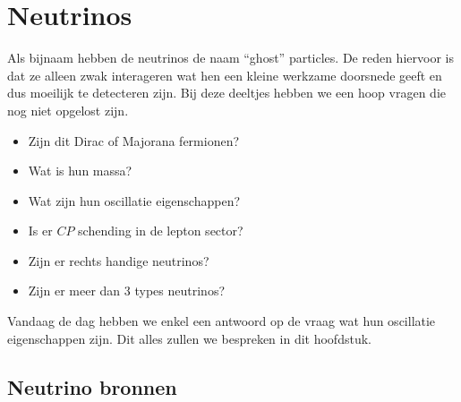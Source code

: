 \documentclass[../main.tex]{subfiles}
\begin{document}
\section{Neutrinos}%
\label{sec:neutrinos}

Als bijnaam hebben de neutrinos de naam ``ghost'' particles. De reden hiervoor is dat ze alleen zwak interageren wat hen een kleine werkzame doorsnede geeft en dus moeilijk te detecteren zijn. Bij deze deeltjes hebben we een hoop vragen die nog niet opgelost zijn.
\begin{itemize}
    \item Zijn dit Dirac of Majorana fermionen?
    \item Wat is hun massa?
    \item Wat zijn hun oscillatie eigenschappen?
    \item Is er $CP$ schending in de lepton sector?
    \item Zijn er rechts handige neutrinos?
    \item Zijn er meer dan 3 types neutrinos?
\end{itemize}
Vandaag de dag hebben we enkel een antwoord op de vraag wat hun oscillatie eigenschappen zijn. Dit alles zullen we bespreken in dit hoofdstuk.

\subsection{Neutrino bronnen}%
\label{sub:neutrino_bronnen}
\end{document}
